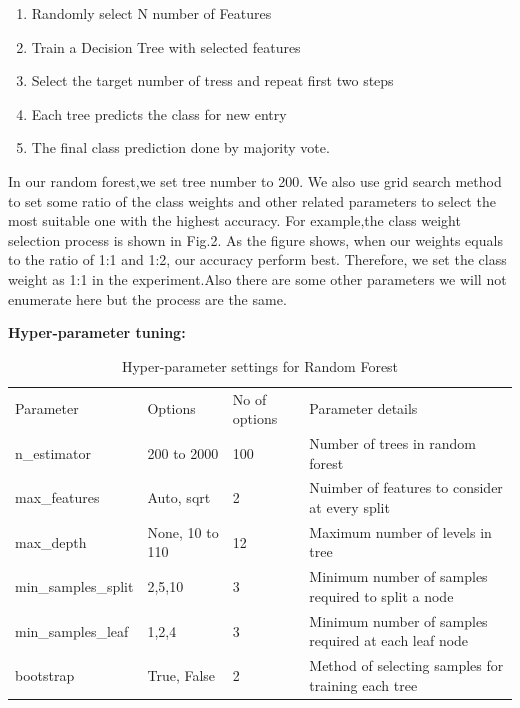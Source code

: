 \begin{enumerate}
    \item Randomly select N number of Features
    \item Train a Decision Tree with selected features
    \item Select the target number of tress and repeat first two steps 
    \item Each tree predicts the class for new entry
    \item The final class prediction done by majority vote. 
\end{enumerate}

In our random forest,we set tree number to 200. We also use grid search method to set some ratio of the class weights and other related parameters to select the most suitable one with the highest accuracy. For example,the class weight selection process is shown in Fig.2. As the figure shows, when our weights equals to the ratio of 1:1 and 1:2, our accuracy perform best. Therefore, we set the class weight as 1:1 in the experiment.Also there are some other parameters we will not enumerate here but the process are the same. 


\textbf{Hyper-parameter tuning:}

\begin{table}[h]
    \begin{tabular}{llll}
    Parameter           & Options         & No of options & Parameter details                                    \\
    n\_estimator        & 200 to 2000     & 100           & Number of trees in random forest                     \\
    max\_features       & Auto, sqrt      & 2             & Nuimber of features to consider at every split       \\
    max\_depth          & None, 10 to 110 & 12            & Maximum number of levels in tree                     \\
    min\_samples\_split & 2,5,10          & 3             & Minimum number of samples required to split a node   \\
    min\_samples\_leaf  & 1,2,4           & 3             & Minimum number of samples required at each leaf node \\
    bootstrap           & True, False     & 2             & Method of selecting samples for training each tree
    \end{tabular}
    \caption{Hyper-parameter settings for Random Forest}
    \label{tab:RF_param}
\end{table}


